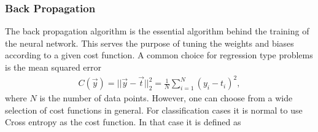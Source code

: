 \subsubsection{Back Propagation} \label{subsubsec: Bp}
The back propagation algorithm is the essential algorithm behind the training of the neural network. This serves the purpose of tuning the weights and biases according to a given cost function. A common choice for regression type problems is the mean squared error
\begin{align}\label{eq:cost_mse}
    C(\vec{y}) = ||\vec{y}-\vec{t}||_2^2 = \frac{1}{N}\sum_{i=1}^N (y_i - t_i)^2,
\end{align}
where $N$ is the number of data points. However, one can choose from a wide selection of cost functions in general. For classification cases it is normal to use Cross entropy as the cost function. In that case it is defined as 

